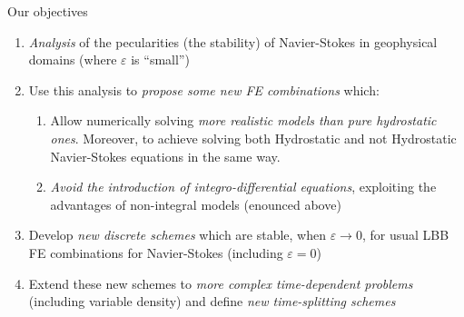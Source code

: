 \begin{frame}{Our objectives}
\begin{enumerate}\itemsep0.66em
\item \textit{Analysis} of the pecularities (the stability) of
  Navier-Stokes in geophysical domains (where $\varepsilon$ is ``small'')
\item Use this analysis to \textit{propose some new FE
    combinations} which:%
  \begin{enumerate}\itemsep0.33em
  \item Allow numerically solving \textit{more realistic models than pure hydrostatic
      ones}. Moreover, to achieve solving both Hydrostatic and not
    Hydrostatic Navier-Stokes equations in the same way.
  \item \textit{Avoid the introduction of integro-differential equations},
    exploiting the advantages of non-integral models (enounced above)
  \end{enumerate}
\item Develop \textit{new discrete schemes} which are
  stable, when $\varepsilon\to 0$, for usual LBB FE combinations for
  Navier-Stokes (including $\varepsilon=0$)
\item Extend these new schemes to \textit{more complex time-dependent
    problems} (including variable density) and define \textit{new
  time-splitting schemes}
\end{enumerate}
\end{frame}



